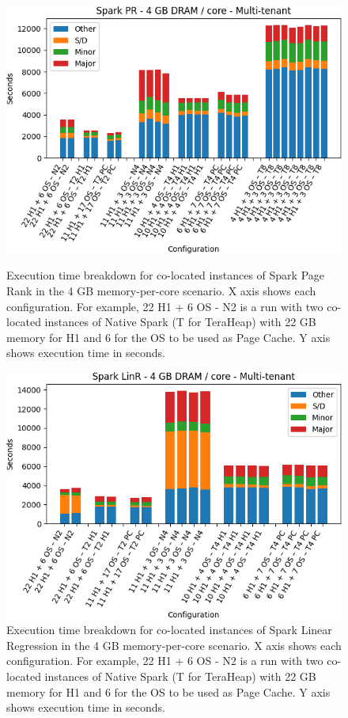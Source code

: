 \begin{figure}[thbp]
\centering
    \includegraphics[width=\linewidth]{./fig/pr64.png}
    \caption{Execution time breakdown for co-located instances of Spark
    Page Rank in the 4 GB memory-per-core scenario. X axis shows each configuration.
        For example, 22 H1 + 6 OS - N2 is a run with two co-located instances of Native Spark (T for TeraHeap) with 22 GB memory for H1 and 6 for the OS to be used as Page Cache. Y axis shows execution time in seconds.}
    \label{fig:pr64}
	\includegraphics[width=\linewidth]{./fig/linr64.png}
    \caption{Execution time breakdown for co-located instances of Spark
    Linear Regression in the 4 GB memory-per-core scenario. X axis shows each configuration.
        For example, 22 H1 + 6 OS - N2 is a run with two co-located instances of Native Spark (T for TeraHeap) with 22 GB memory for H1 and 6 for the OS to be used as Page Cache. Y axis shows execution time in seconds.}
    \label{fig:linr64}
\end{figure}

